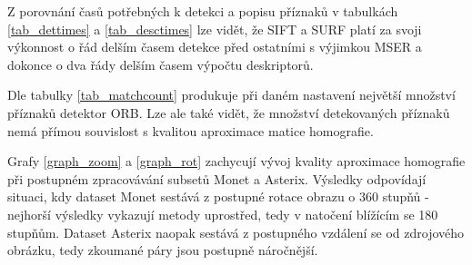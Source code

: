 Z porovnání časů potřebných k detekci a popisu příznaků v tabulkách \ref{tab_dettimes} a \ref{tab_desctimes} lze vidět, že SIFT a SURF platí za svoji
výkonnost o řád delším časem detekce před ostatními s výjimkou MSER a dokonce o dva řády delším časem výpočtu deskriptorů.

Dle tabulky \ref{tab_matchcount} produkuje při daném nastavení největší množství příznaků detektor ORB. Lze ale také vidět, že množství
detekovaných příznaků nemá přímou souvislost s kvalitou aproximace matice homografie.

Grafy \ref{graph_zoom} a \ref{graph_rot} zachycují vývoj kvality aproximace homografie při postupném zpracovávání subsetů Monet a Asterix.
Výsledky odpovídají situaci, kdy dataset Monet sestává z postupné rotace obrazu o 360 stupňů - nejhorší výsledky vykazují metody uprostřed, tedy
v natočení blížícím se 180 stupňům. Dataset Asterix naopak sestává z postupného vzdálení se od zdrojového obrázku, tedy zkoumané páry jsou postupně
náročnější.








%


